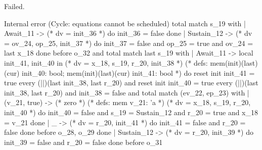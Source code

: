 \runverbatimfalse
{}
\begin{RunVerbatimMsg}
Failed.
\end{RunVerbatimMsg}
\begin{RunVerbatimErr}
Internal error (Cycle: equations cannot be scheduled)
 total match s_19 with
 | Await_11 ->  (* dv = {init_36} *)
                do init_36 = false done
 | Sustain_12 -> 
     (* dv = {ov_24, op_25, init_37} *)
     do init_37 = false and op_25 = true and ov_24 = last x_18 done
  before {o_32}
 and total match last s_19 with
     | Await_11 -> 
         local init_41, init_40 in
         (* dv = {x_18, s_19, r_20, init_38} *)
         (* defs: mem(init)(last)(cur) init_40: bool;
                  mem(init)(last)(cur) init_41: bool *)
         do reset init init_41 = true 
            every (||)(last init_38, last r_20)
         and reset init init_40 = true 
             every (||)(last init_38, last r_20)
         and init_38 = false
         and total match (ev_22, ep_23) with
             | (v_21, true) -> (* zero *)
                 (* defs: mem v_21: 'a *)
                 (* dv = {x_18, s_19, r_20, init_40} *)
                 do init_40 = false
                 and s_19 = Sustain_12 and r_20 = true and x_18 = v_21 done
             | _ -> 
                 (* dv = {r_20, init_41} *)
                 do init_41 = false and r_20 = false done
              before {o_28, o_29}
         done
     | Sustain_12 -> 
         (* dv = {r_20, init_39} *)
         do init_39 = false and r_20 = false done
      before {o_31}
 
\end{RunVerbatimErr}
